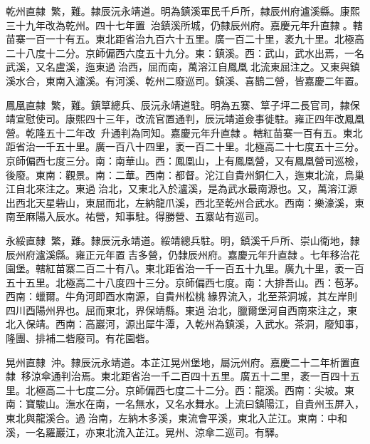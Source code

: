 \begin{pinyinscope}
乾州直隸：繁，難。隸辰沅永靖道。明為鎮溪軍民千戶所，隸辰州府瀘溪縣。康熙三十九年改為乾州。四十七年置，治鎮溪所城，仍隸辰州府。嘉慶元年升直隸。轄苗寨一百一十有五。東北距省治九百六十五里。廣一百二十里，袤九十里。北極高二十八度十二分。京師偏西六度五十九分。東：鎮溪。西：武山，武水出焉，一名武溪，又名盧溪，迤東過治西，屈而南，萬溶江自鳳凰北流東屈注之。又東與鎮溪水合，東南入瀘溪。有河溪、乾州二廢巡司。鎮溪、喜鵲二營，皆嘉慶二年置。

鳳凰直隸：繁，難。鎮筸總兵、辰沅永靖道駐。明為五寨、筸子坪二長官司，隸保靖宣慰使司。康熙四十三年，改流官置通判，辰沅靖道僉事徙駐。雍正四年改鳳凰營。乾隆五十二年改，升通判為同知。嘉慶元年升直隸。轄紅苗寨一百有五。東北距省治一千五十里。廣一百八十四里，袤一百二十里。北極高二十七度五十三分。京師偏西七度三分。南：南華山。西：鳳凰山，上有鳳凰營，又有鳳凰營司巡檢，後廢。東南：觀景。南：二華。西南：都督。沱江自貴州銅仁入，迤東北流，烏巢江自北來注之。東過治北，又東北入於瀘溪，是為武水最南源也。又，萬溶江源出西北天星砦山，東屈而北，左納龍爪溪，西北至乾州合武水。西南：樂濠溪，東南至麻陽入辰水。祐營，知事駐。得勝營、五寨站有巡司。

永綏直隸：繁，難。隸辰沅永靖道。綏靖總兵駐。明，鎮溪千戶所、崇山衛地，隸辰州府瀘溪縣。雍正元年置吉多營，仍隸辰州府。嘉慶元年升直隸。七年移治花園堡。轄紅苗寨二百二十有八。東北距省治一千一百五十九里。廣九十里，袤一百五十五里。北極高二十八度四十三分。京師偏西七度。南：大排吾山。西：苞茅。西南：蠟爾。牛角河即酉水南源，自貴州松桃緣界流入，北至茶洞城，其左岸則四川酉陽州界也。屈而東北，界保靖縣。東過治北，臘爾堡河自西南來注之，東北入保靖。西南：高巖河，源出犀牛潭，入乾州為鎮溪，入武水。茶洞，廢知事，隆團、排補二砦廢司。有花園砦。

晃州直隸：沖。隸辰沅永靖道。本芷江晃州堡地，屬沅州府。嘉慶二十二年析置直隸，移涼傘通判治焉。東北距省治一千二百四十五里。廣五十二里，袤一百四十五里。北極高二十七度二分。京師偏西七度二十二分。西：龍溪。西南：尖坡。東南：寶駿山。潕水在南，一名無水，又名水舞水。上流曰鎮陽江，自貴州玉屏入，東北與龍溪合。過治南，左納木多溪，東流會平溪，東北入芷江。東南：中和溪，一名羅巖江，亦東北流入芷江。晃州、涼傘二巡司。有驛。


\end{pinyinscope}